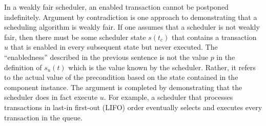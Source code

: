 
In a weakly fair scheduler, an enabled transaction cannot be postponed indefinitely.
Argument by contradiction is one approach to demonstrating that a scheduling algorithm is weakly fair.
If one assumes that a scheduler is not weakly fair, then there must be some scheduler state $s(t_c)$ that contains a transaction $u$ that is enabled in every subsequent state but never executed.
The ``enabledness'' described in the previous sentence is not the value $p$ in the definition of $s_u(t)$ which is the value known by the scheduler.
Rather, it refers to the actual value of the precondition based on the state contained in the component instance.
The argument is completed by demonstrating that the scheduler does in fact execute $u$.
For example, a scheduler that processes transactions in last-in first-out (LIFO) order eventually selects and executes every transaction in the queue.

